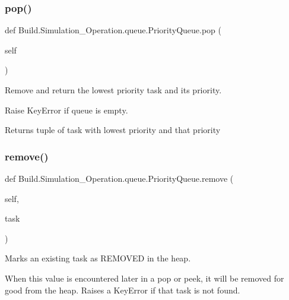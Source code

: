 \subsubsection{\texorpdfstring{pop()}{pop()}}
{\footnotesize\ttfamily def Build.\+Simulation\+\_\+\+Operation.\+queue.\+Priority\+Queue.\+pop (\begin{DoxyParamCaption}\item[{}]{self }\end{DoxyParamCaption})}



Remove and return the lowest priority task and its priority. 

Raise Key\+Error if queue is empty. \begin{DoxyReturn}{Returns}
tuple of task with lowest priority and that priority 
\end{DoxyReturn}
\mbox{\label{class_build_1_1_simulation___operation_1_1queue_1_1_priority_queue_a86faaf2d1f76eb146b6e1d5a55df09ba}} 
\subsubsection{\texorpdfstring{remove()}{remove()}}
{\footnotesize\ttfamily def Build.\+Simulation\+\_\+\+Operation.\+queue.\+Priority\+Queue.\+remove (\begin{DoxyParamCaption}\item[{}]{self,  }\item[{}]{task }\end{DoxyParamCaption})}



Marks an existing task as R\+E\+M\+O\+V\+ED in the heap. 

When this value is encountered later in a pop or peek, it will be removed for good from the heap. Raises a Key\+Error if that task is not found. \mbox{\label{class_build_1_1_simulation___operation_1_1queue_1_1_priority_queue_af953e022ce390c5090ebe7de4f1ea6ec}} 
